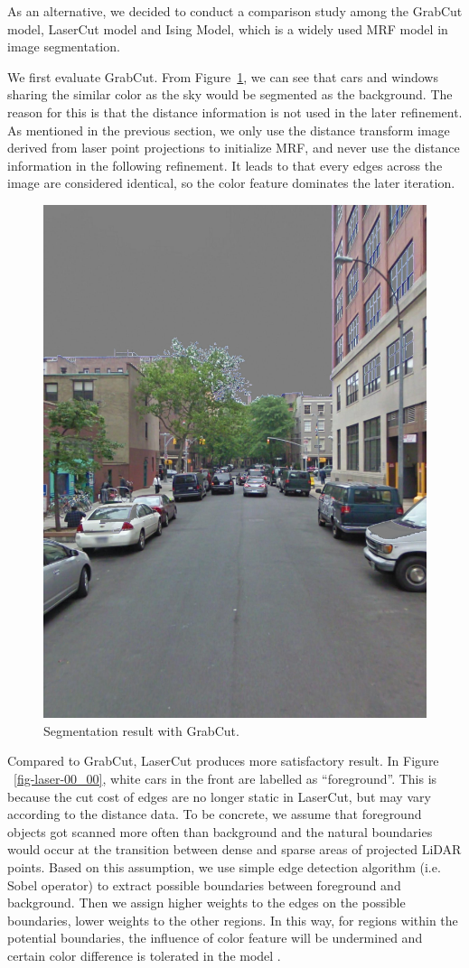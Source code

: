 \documentclass{article} %
\begin{document}
As an alternative, we decided to conduct a comparison study among the
GrabCut model, LaserCut model and Ising Model, which is a widely used
MRF model in image segmentation. 

We first evaluate GrabCut.
From Figure~\ref{fig-grab-00_00}, we can see that cars and
windows sharing the similar color as the sky would be segmented as the
background. 
The reason for this is that the distance information is not used in
the later refinement.
As mentioned in the previous section, we only
use the distance transform image derived from laser point projections
to initialize MRF, and never use the distance information in the
following refinement. It leads to that every edges across the image
are considered identical, so the color feature dominates the
later iteration.

\begin{figure}[h]
\begin{center}
\includegraphics[height=0.5\linewidth]{./fig/overlay_00_00_grab.jpg}
\end{center}
\caption{Segmentation result with GrabCut.}
\label{fig-grab-00_00}
\end{figure}


Compared to GrabCut, LaserCut produces more satisfactory result. In
Figure ~\ref{fig-laser-00_00},  white cars in the front are labelled
as ``foreground''.
This is because the cut cost of edges are no longer static in
LaserCut, but may vary according to the distance data.
To be concrete, we assume that foreground objects got scanned more
often than background and the natural boundaries would occur at the
transition between dense and sparse areas of projected LiDAR points. 
Based on this assumption, we use simple edge detection algorithm
(i.e. Sobel operator) to extract possible boundaries between
foreground and background. 
Then we assign higher weights to the edges on the possible
boundaries, lower weights to the other regions.
In this way, for regions within the potential boundaries,
the influence of color feature will be undermined and certain color
difference is tolerated in the model .
\end{document}
